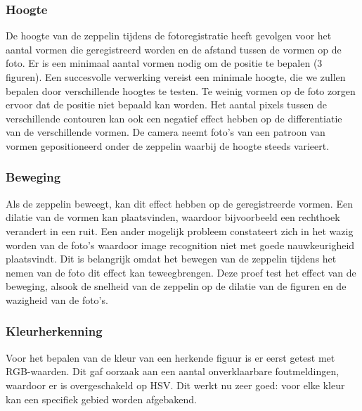 \documentclass[eind]{penoverslag}
\begin{document}
\subsubsection{Hoogte}
De hoogte van de zeppelin tijdens de fotoregistratie heeft gevolgen voor het aantal vormen die geregistreerd worden en de afstand tussen de vormen op de foto. Er is een minimaal aantal vormen nodig om de positie te bepalen (3 figuren). Een succesvolle verwerking vereist een minimale hoogte, die we zullen bepalen door verschillende hoogtes te testen. Te weinig vormen op de foto zorgen ervoor dat de positie niet bepaald kan worden. Het aantal pixels tussen de verschillende contouren kan ook een negatief effect hebben op de differentiatie van de verschillende vormen. De camera neemt foto’s van een patroon van vormen gepositioneerd onder de zeppelin waarbij de hoogte steeds varieert.
\subsubsection{Beweging}
Als de zeppelin beweegt, kan dit effect hebben op de geregistreerde vormen. Een dilatie van de vormen kan plaatsvinden, waardoor bijvoorbeeld een rechthoek verandert in een ruit. Een ander mogelijk probleem constateert zich in het wazig worden van de foto’s waardoor image recognition niet met goede nauwkeurigheid plaatsvindt. Dit is belangrijk omdat het bewegen van de zeppelin tijdens het nemen van de foto dit effect kan teweegbrengen. Deze proef test het effect van de beweging, alsook de snelheid van de zeppelin op de dilatie van de figuren en de wazigheid van de foto’s.  

\subsubsection{Kleurherkenning}
Voor het bepalen van de kleur van een herkende figuur is er eerst getest met RGB-waarden. Dit gaf oorzaak aan een aantal onverklaarbare foutmeldingen, waardoor er is overgeschakeld op HSV. Dit werkt nu zeer goed: voor elke kleur kan een specifiek gebied worden afgebakend. 
\end{document}
